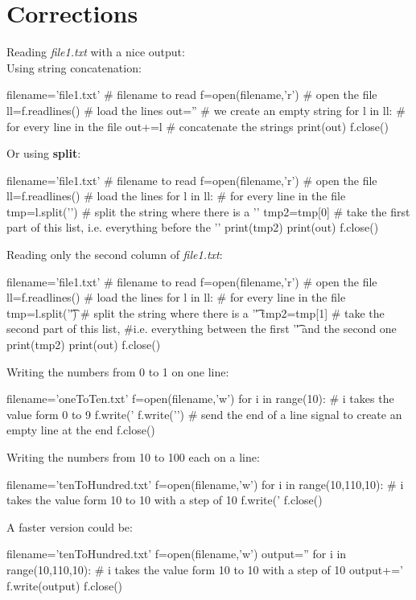 \documentclass[article,10pt]{scrartcl}
\begin{document}
\section*{Corrections}
Reading \textit{file1.txt} with a nice output:\\
\label{ex1}
Using string concatenation:\\
\begin{python}
filename='file1.txt' # filename to read
f=open(filename,'r') # open the file
ll=f.readlines() # load the lines
out='' # we create an empty string
for l in ll: # for every line in the file
   out+=l # concatenate the strings
print(out)
f.close()
\end{python}
Or using \textbf{split}:\\
\begin{python}
filename='file1.txt' # filename to read
f=open(filename,'r') # open the file
ll=f.readlines() # load the lines
for l in ll: # for every line in the file
   tmp=l.split('\n') #  split the string where there is a '\n'
   tmp2=tmp[0] # take the first part of this list, i.e. everything before the '\n'
   print(tmp2)
print(out)
f.close()
\end{python}
Reading only the second column of \textit{file1.txt}:
\label{ex2}
\begin{python}
filename='file1.txt' # filename to read
f=open(filename,'r') # open the file
ll=f.readlines() # load the lines
for l in ll: # for every line in the file
   tmp=l.split('\t') #  split the string where there is a '\t'
   tmp2=tmp[1] # take the second part of this list, 
#i.e. everything between the first '\t' and the second one
   print(tmp2)
print(out)
f.close()
\end{python}
Writing the numbers from 0 to 1 on one line:
\begin{python}
filename='oneToTen.txt' 
f=open(filename,'w')
for i in range(10): # i takes the value form 0 to 9
   f.write('%
f.write('\n') # send the end of a line signal to create an empty line at the end
f.close()
\end{python}
Writing the numbers from 10 to 100 each on a line:
\begin{python}
filename='tenToHundred.txt'
f=open(filename,'w')
for i in range(10,110,10): # i takes the value form 10 to 10 with a step of 10
   f.write('%
f.close()
\end{python}
A faster version could be:
\begin{python}
filename='tenToHundred.txt'
f=open(filename,'w')
output=''
for i in range(10,110,10): # i takes the value form 10 to 10 with a step of 10
   output+='%
f.write(output)
f.close()
\end{python}
\end{document}
